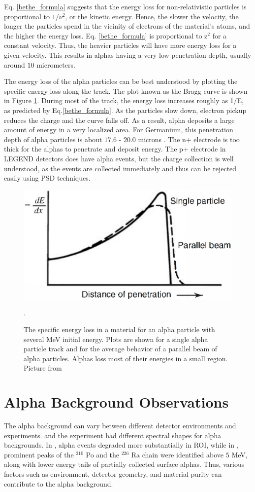 Eq. \ref{bethe_formula} suggests that the energy loss for non-relativistic particles is proportional to $1/\nu^2$, or the kinetic energy. Hence, the slower the velocity, the longer the particles spend in the vicinity of electrons of the material's atoms, and the higher the energy loss. Eq. \ref{bethe_formula} is proportional to z$^2$ for a constant velocity. Thus, the heavier particles will have more energy loss for a given velocity. This results in alphas having a very low penetration depth, usually around $10$ micrometers.

The energy loss of the alpha particles can be best understood by plotting the specific energy loss along the track. The plot known as the Bragg curve is shown in Figure \ref{bragg_curve_fig}. During most of the track, the energy loss increases roughly as 1/E, as predicted by Eq.\ref{bethe_formula}. As the particles slow down, electron pickup reduces the charge and the curve falls off. As a result, alpha deposits a large amount of energy in a very localized area. For Germanium, this penetration depth of alpha particles is about $17.6$ - $20.0$ microns \cite{knoll_2010}. The n+ electrode is too thick for the alphas to penetrate and deposit energy. The p+ electrode in LEGEND detectors does have alpha events, but the charge collection is well understood, as the events are collected immediately and thus can be rejected easily using PSD techniques. 

\begin{figure}
\centering
\includegraphics[width=0.5\linewidth]{ch3/figs/bragg_curve.png}
\caption{The specific energy loss in a material for an alpha particle with several MeV initial energy. Plots are shown for a single alpha particle track and for the average behavior of a parallel beam of alpha particles. Alphas loss most of their energies in a small region. Picture from \cite{knoll_2010}}. 
\label{bragg_curve_fig}
\end{figure}

\section{Alpha Background Observations}
\label{ch3_sec_alpha}
The alpha background can vary between different detector environments and experiments. {\MJD} and the {\Gerda} experiment had different spectral shapes for alpha backgrounds. In {\MJD}, alpha events degraded more substantially in ROI, while in \Gerda, prominent peaks of the $^{210}$ Po and the $^{226}$ Ra chain were identified above $5$ MeV, along with lower energy tails of partially collected surface alphas. Thus, various factors such as environment, detector geometry, and material purity can contribute to the alpha background.


